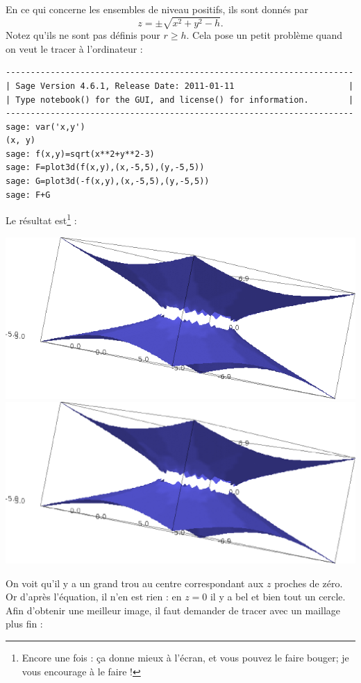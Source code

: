 \begin{example}
    En ce qui concerne les ensembles de niveau positifs, ils sont donnés par
    \begin{equation}
        z=\pm\sqrt{x^2+y^2-h}.
    \end{equation}
    Notez qu'ils ne sont pas définis pour $r\geq h$. Cela pose un petit problème quand on veut le tracer à l'ordinateur :
    \begin{verbatim}
----------------------------------------------------------------------
| Sage Version 4.6.1, Release Date: 2011-01-11                       |
| Type notebook() for the GUI, and license() for information.        |
----------------------------------------------------------------------
sage: var('x,y')
(x, y)
sage: f(x,y)=sqrt(x**2+y**2-3)
sage: F=plot3d(f(x,y),(x,-5,5),(y,-5,5)) 
sage: G=plot3d(-f(x,y),(x,-5,5),(y,-5,5))    
sage: F+G
    \end{verbatim}
Le résultat est\footnote{Encore une fois : ça donne mieux à l'écran, et vous pouvez le faire bouger; je vous encourage à le faire !} :
    \begin{center}
        \ifpdf
            \includegraphics[width=15cm]{AdSmauvais.png}
        \else
            \includegraphics[width=15cm]{AdSmauvais.eps}
        \fi
    \end{center}
    On voit qu'il y a un grand trou au centre correspondant aux $z$ proches de zéro. Or d'après l'équation, il n'en est rien : en $z=0$ il y a bel et bien tout un cercle. Afin d'obtenir une meilleur image, il faut demander de tracer avec un maillage plus fin :

\end{example}
